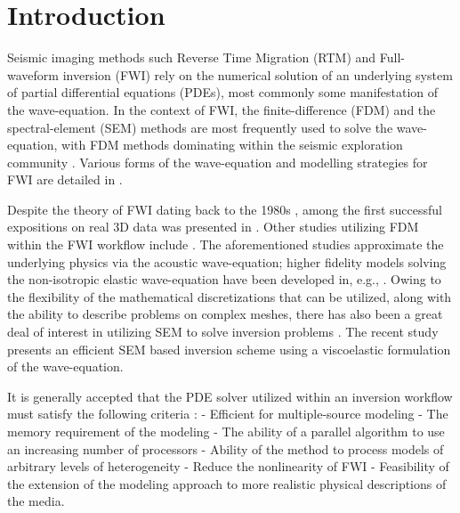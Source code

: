 \documentclass[conference]{IEEEtran}
\begin{document}
\section{Introduction}\label{introduction}

Seismic imaging methods such Reverse Time Migration (RTM) and
Full-waveform inversion (FWI) rely on the numerical solution of an
underlying system of partial differential equations (PDEs), most
commonly some manifestation of the wave-equation. In the context of FWI,
the finite-difference (FDM) and the spectral-element (SEM) methods are
most frequently used to solve the wave-equation, with FDM methods
dominating within the seismic exploration community \cite{lyu2020}.
Various forms of the wave-equation and modelling strategies for FWI are
detailed in \cite{fichtner2011}.

Despite the theory of FWI dating back to the 1980s
\cite{tarantola}, among the first successful
expositions on real 3D data was presented in \cite{sirgue2009}. Other
studies utilizing FDM within the FWI workflow include
\cite{ratcliffe2011, petersson2013}. The aforementioned studies
approximate the underlying physics via the acoustic wave-equation;
higher fidelity models solving the non-isotropic elastic wave-equation
have been developed in, e.g.,
\cite{osti_1468379, osti_1561580, osti_1561581, sava1, sava2}. Owing to
the flexibility of the mathematical discretizations that can be
utilized, along with the ability to describe problems on complex meshes,
there has also been a great deal of interest in utilizing SEM to solve
inversion problems \cite{peter2011, krebsdg}. The recent study
\cite{trinh2019} presents an efficient SEM based inversion scheme using
a viscoelastic formulation of the wave-equation.

It is generally accepted that the PDE solver utilized within an
inversion workflow must satisfy the following criteria
\cite{virieuxmodelling}: - Efficient for multiple-source modeling - The
memory requirement of the modeling - The ability of a parallel algorithm
to use an increasing number of processors - Ability of the method to
process models of arbitrary levels of heterogeneity - Reduce the
nonlinearity of FWI - Feasibility of the extension of the modeling
approach to more realistic physical descriptions of the media.
\end{document}
